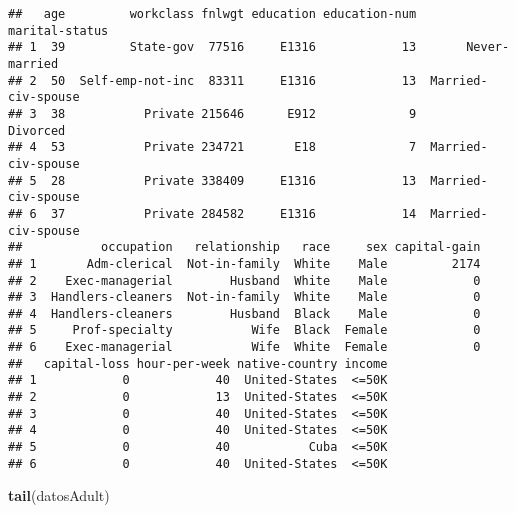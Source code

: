 \documentclass[]{article}
\newenvironment{Shaded}{\begin{snugshade}}{\end{snugshade}}
\newcommand{\KeywordTok}[1]{\textcolor[rgb]{0.13,0.29,0.53}{\textbf{#1}}}
\newcommand{\NormalTok}[1]{#1}
\begin{document}
\begin{verbatim}
##   age         workclass fnlwgt education education-num      marital-status
## 1  39         State-gov  77516     E1316            13       Never-married
## 2  50  Self-emp-not-inc  83311     E1316            13  Married-civ-spouse
## 3  38           Private 215646      E912             9            Divorced
## 4  53           Private 234721       E18             7  Married-civ-spouse
## 5  28           Private 338409     E1316            13  Married-civ-spouse
## 6  37           Private 284582     E1316            14  Married-civ-spouse
##           occupation   relationship   race     sex capital-gain
## 1       Adm-clerical  Not-in-family  White    Male         2174
## 2    Exec-managerial        Husband  White    Male            0
## 3  Handlers-cleaners  Not-in-family  White    Male            0
## 4  Handlers-cleaners        Husband  Black    Male            0
## 5     Prof-specialty           Wife  Black  Female            0
## 6    Exec-managerial           Wife  White  Female            0
##   capital-loss hour-per-week native-country income
## 1            0            40  United-States  <=50K
## 2            0            13  United-States  <=50K
## 3            0            40  United-States  <=50K
## 4            0            40  United-States  <=50K
## 5            0            40           Cuba  <=50K
## 6            0            40  United-States  <=50K
\end{verbatim}

\begin{Shaded}
\begin{Highlighting}[]
\KeywordTok{tail}\NormalTok{(datosAdult)}
\end{Highlighting}
\end{Shaded}
\end{document}
